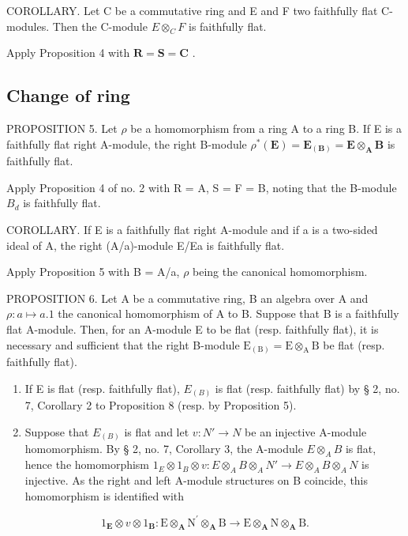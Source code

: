 COROLLARY. Let C be a commutative ring and E and F two faithfully flat C-modules. Then the C-module \(E \otimes_{C} F\) is faithfully flat.

Apply Proposition 4 with \(\mathbf{R} = \mathbf{S} = \mathbf{C}\) .

\subsection{Change of ring}

PROPOSITION 5. Let \(\rho\) be a homomorphism from a ring A to a ring B. If E is a faithfully flat right A-module, the right B-module \(\rho^{*}(\mathbf{E}) = \mathbf{E}_{(\mathbf{B})} = \mathbf{E} \otimes_{\mathbf{A}} \mathbf{B}\) is faithfully flat.

Apply Proposition 4 of no. 2 with R = A, S = F = B, noting that the B-module \(B_{d}\) is faithfully flat.

COROLLARY. If E is a faithfully flat right A-module and if a is a two-sided ideal of A, the right (A/a)-module E/Ea is faithfully flat.

Apply Proposition 5 with B = A/a, \(\rho\) being the canonical homomorphism.

PROPOSITION 6. Let A be a commutative ring, B an algebra over A and \(\rho: a \mapsto a . 1\) the canonical homomorphism of A to B. Suppose that B is a faithfully flat A-module. Then, for an A-module E to be flat (resp. faithfully flat), it is necessary and sufficient that the right B-module \(\mathrm{E}_{(\mathrm{B})} = \mathrm{E} \otimes_{\mathrm{A}} \mathrm{B}\) be flat (resp. faithfully flat).

\begin{enumerate}
\def\labelenumi{(\arabic{enumi})}
\item
  If E is flat (resp. faithfully flat), \(E_{(B)}\) is flat (resp. faithfully flat) by § 2, no. 7, Corollary 2 to Proposition 8 (resp. by Proposition 5).
\item
  Suppose that \(E_{(B)}\) is flat and let \(v: N' \to N\) be an injective A-module homomorphism. By § 2, no. 7, Corollary 3, the A-module \(E \otimes_{A} B\) is flat, hence the homomorphism \(1_{E} \otimes 1_{B} \otimes v: E \otimes_{A} B \otimes_{A} N' \to E \otimes_{A} B \otimes_{A} N\) is injective. As the right and left A-module structures on B coincide, this homomorphism is identified with
\end{enumerate}

\[
\mathrm{1} _ {\mathbf {E}} \otimes v \otimes \mathrm{1} _ {\mathbf {B}}: \mathrm{E} \otimes_ {\mathbf {A}} \mathrm{N} ^ {\prime} \otimes_ {\mathbf {A}} \mathrm{B} \rightarrow \mathrm{E} \otimes_ {\mathbf {A}} \mathrm{N} \otimes_ {\mathbf {A}} \mathrm{B}.
\]

